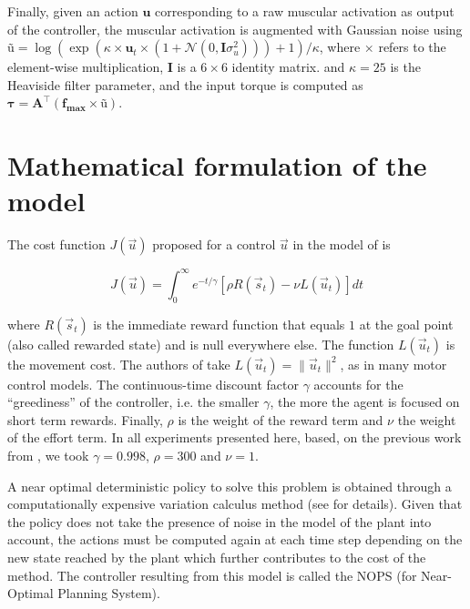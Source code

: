 \documentclass[pdftex,a4paper,12pt]{report}
\begin{document}
Finally, given an action $\textbf{u}$ corresponding to a raw muscular activation as output of the
controller, the muscular activation
is augmented with Gaussian noise using $\textbf{\~{u}} = \log(\exp(\kappa \times \textbf{u}_t \times (1+\mathcal{N}(0,\textbf{I}\sigma_u^2))) + 1) / \kappa$, where $\times$ refers to the element-wise multiplication, $\textbf{I}$ is a $6 \times 6$ identity matrix.
and $\kappa = 25$ is the Heaviside filter parameter, and the input torque 
is computed as $\boldsymbol{\tau} = \textbf{A}^\top ( \textbf{f}_\textbf{max} \times \textbf{\~{u}} )$.

\section{Mathematical formulation of the model}
\label{sec_modelformulation}

The cost function $J(\vec{u})$ proposed for a control $\vec{u}$ in the model of \cite{rigoux12_plos} is

\begin{equation}
\label{eq:criterion}
 J(\vec{u}) = \int_0^{\infty} e^{-t/\gamma} [ \rho R(\vec{s}_t) - \nu L(\vec{u}_t) ] dt
\end{equation}

where $R(\vec{s}_t)$ is the immediate reward function that equals $1$ at the goal point (also called rewarded state) and is null everywhere else. The function $L(\vec{u}_t)$ is the movement cost. The authors of \cite{rigoux12_plos} take $L(\vec{u}_t) = \|\vec{u}_t\|^2$, as in many motor control models. 
The continuous-time discount factor $\gamma$ accounts for the ``greediness'' of the controller, i.e. the smaller $\gamma$, the more the agent is focused on short term rewards.
Finally, $\rho$ is the weight of the reward term and $\nu$ the weight of the effort term.
In all experiments presented here, based, on the previous work from \cite{rigoux12_plos}, we took $\gamma=0.998$, $\rho=300$ and $\nu=1$.

A near optimal deterministic policy to solve this problem is obtained through a computationally expensive variation calculus method (see \cite{rigoux_these} for details).
Given that the policy does not take the presence of noise in the model of the plant into account, 
the actions must be computed again at each time step depending on the new state reached by the plant
which further contributes to the cost of the method.
The controller resulting from this model is called the NOPS (for Near-Optimal Planning System).
\end{document}
